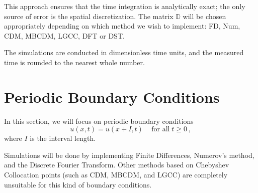 \documentclass[11pt,a4paper,oneside,openright]{report} %
\begin{document}
This approach ensures that the time integration is analytically exact; the only source of error is the spatial discretization. The matrix $\mathbb{D}$ will be chosen appropriately depending on which method we wish to implement: FD, Num, CDM, MBCDM, LGCC, DFT or DST.

The simulations are conducted in dimensionless time units, and the measured time is rounded to the nearest whole number.



\section{Periodic Boundary Conditions}
\noindent
In this section, we will focus on periodic boundary conditions
\begin{equation}
    u(x, t) = u(x + I, t) \,  \quad \text{for all} \; t \geq 0 \, ,
\end{equation}
where $I$ is the interval length.

Simulations will be done by implementing Finite Differences, Numerov's method, and the Discrete Fourier Transform. Other methods based on Chebyshev Collocation points (such as CDM, MBCDM, and LGCC) are completely unsuitable for this kind of boundary conditions.
\end{document}
